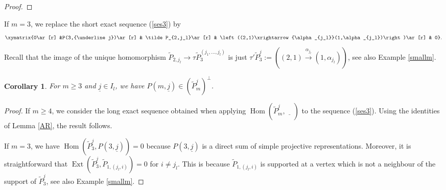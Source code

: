 \documentclass{amsart}
\newtheorem{corollary}[theorem]{Corollary}
\numberwithin{equation}{section}
\newcommand{\uj}{{\underline j}}
\newcommand{\kk}{\Bbbk}
\newcommand{\Ext}{\operatorname{Ext}}
\newcommand{\Hom}{\operatorname{Hom}}
\begin{document}
\begin{proof}



\end{proof}



If $m=3$, we replace the short exact sequence (\ref{ses3}) by
 \begin{align}
   \label{ses4}
   \xymatrix{0\ar[r] &P(3,\uj)\ar[r] &  \tilde P_{2,j_l}\ar[r] & \left((2,1)\xrightarrow{\alpha_{j_l}}(1,\alpha_{j_l})\right)\ar[r] & 0}.
 \end{align}
 Recall that the image of the unique homomorphism $\tilde P_{2,j_l}\to\tau\tilde P_{3}^{(j_1,\ldots,j_l)}$ is just $\tau'\tilde P_3^{\uj}:=\left((2,1)\xrightarrow{\alpha_{j_l}}(1,\alpha_{j_l})\right)$, see also Example \ref{smallm}. 

\begin{corollary}\label{cor:perpendicular}
For $m\geq 3$ and $\uj\in I_l$, we have $P(m,\uj)\in (\tilde P_{m}^{\uj})^\perp$.
\end{corollary}
\begin{proof}
If $m\geq 4$, we consider the long exact sequence obtained when applying $\Hom(\tilde P_{m}^{\uj},\underline{\quad})$ to the sequence (\ref{ses3}). Using the identities of Lemma \ref{AR}, the result follows.

If $m=3$, we have $\Hom(\tilde P_{3}^{\uj},P(3,\uj))=0$ because $P(3,\uj)$ is a direct sum of simple projective representations. Moreover, it is straightforward that 
$\Ext(\tilde P_{3}^{\uj},\tilde P_{1,(j_l,i)})=0$ for $i\neq j_l$. This is because $\tilde P_{1,(j_l,i)}$ is supported at a  vertex which is not a neighbour of the support of $\tilde P_{3}^{\uj}$, see also Example  \ref{smallm}.

\end{proof}
\end{document}
